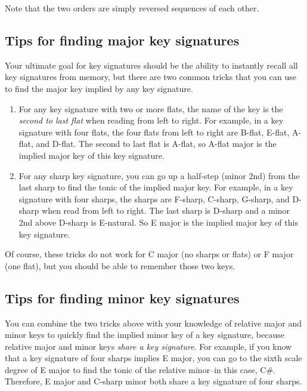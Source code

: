\documentclass{book}
\providecommand{\tightlist}{%
  \setlength{\itemsep}{0pt}\setlength{\parskip}{0pt}}
\begin{document}
Note that the two orders are simply reversed sequences of each other.

\hypertarget{tips-for-finding-major-key-signatures}{%
\subsection{Tips for finding major key
signatures}\label{tips-for-finding-major-key-signatures}}

Your ultimate goal for key signatures should be the ability to instantly
recall all key signatures from memory, but there are two common tricks that
you can use to find the major key implied by any key signature.

\begin{enumerate}
\def\labelenumi{\arabic{enumi}.}
\tightlist
\item
  For any key signature with two or more flats, the name of the key is the
  \emph{second to last flat} when reading from left to right. For example, in
  a key signature with four flats, the four flats from left to right are
  B-flat, E-flat, A-flat, and D-flat. The second to last flat is A-flat, so
  A-flat major is the implied major key of this key signature.
\item
  For any sharp key signature, you can go up a half-step (minor 2nd) from the
  last sharp to find the tonic of the implied major key. For example, in a key
  signature with four sharps, the sharps are F-sharp, C-sharp, G-sharp, and
  D-sharp when read from left to right. The last sharp is D-sharp and a minor
  2nd above D-sharp is E-natural. So E major is the implied major key of this
  key signature.
\end{enumerate}

Of course, these tricks do not work for C major (no sharps or flats) or F
major (one flat), but you should be able to remember those two keys.

\hypertarget{tips-for-finding-minor-key-signatures}{%
\subsection{Tips for finding minor key
signatures}\label{tips-for-finding-minor-key-signatures}}

You can combine the two tricks above with your knowledge of relative major and
minor keys to quickly find the implied minor key of a key signature, because
relative major and minor keys \emph{share a key signature}. For example, if
you know that a key signature of four sharps implies E major, you can go to
the sixth scale degree of E major to find the tonic of the relative minor--in
this case, C\#. Therefore, E major and C-sharp minor both share a key
signature of four sharps.
\end{document}

